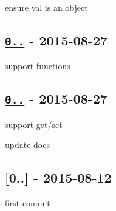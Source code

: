 \begin{DoxyItemize}
\item ensure val is an object
\end{DoxyItemize}

\subsection*{\href{https://github.com/jonschlinkert/define-property/compare/0.2.0...0.2.1}{\tt 0..} -\/ 2015-\/08-\/27}


\begin{DoxyItemize}
\item support functions
\end{DoxyItemize}

\subsection*{\href{https://github.com/jonschlinkert/define-property/compare/0.1.3...0.2.0}{\tt 0..} -\/ 2015-\/08-\/27}


\begin{DoxyItemize}
\item support get/set
\item update docs
\end{DoxyItemize}

\subsection*{\mbox{[}0..\mbox{]} -\/ 2015-\/08-\/12}


\begin{DoxyItemize}
\item first commit 
\end{DoxyItemize}